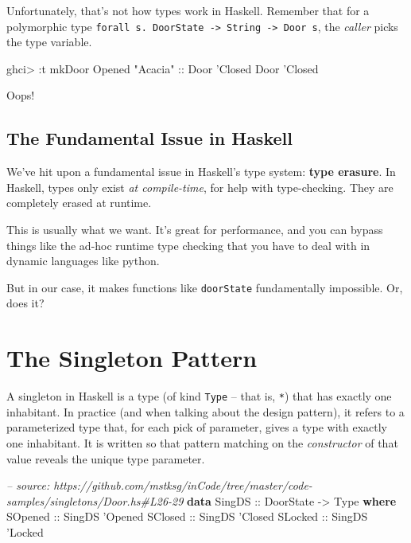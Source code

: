\documentclass[]{article}
\newenvironment{Shaded}{\begin{snugshade}}{\end{snugshade}}
\newcommand{\CharTok}[1]{\textcolor[rgb]{0.31,0.60,0.02}{#1}}
\newcommand{\CommentTok}[1]{\textcolor[rgb]{0.56,0.35,0.01}{\textit{#1}}}
\newcommand{\DataTypeTok}[1]{\textcolor[rgb]{0.13,0.29,0.53}{#1}}
\newcommand{\FunctionTok}[1]{\textcolor[rgb]{0.00,0.00,0.00}{#1}}
\newcommand{\KeywordTok}[1]{\textcolor[rgb]{0.13,0.29,0.53}{\textbf{#1}}}
\newcommand{\NormalTok}[1]{#1}
\newcommand{\OtherTok}[1]{\textcolor[rgb]{0.56,0.35,0.01}{#1}}
\newcommand{\StringTok}[1]{\textcolor[rgb]{0.31,0.60,0.02}{#1}}
\begin{document}
Unfortunately, that's not how types work in Haskell. Remember that for a
polymorphic type
\texttt{forall\ s.\ DoorState\ -\textgreater{}\ String\ -\textgreater{}\ Door\ s},
the \emph{caller} picks the type variable.

\begin{Shaded}
\begin{Highlighting}[]
\NormalTok{ghci}\FunctionTok{>} \FunctionTok{:}\NormalTok{t mkDoor }\DataTypeTok{Opened} \StringTok{"Acacia"}\OtherTok{ ::} \DataTypeTok{Door} \CharTok{'Closed}
\DataTypeTok{Door} \CharTok{'Closed}
\end{Highlighting}
\end{Shaded}

Oops!

\hypertarget{the-fundamental-issue-in-haskell}{%
\subsection{The Fundamental Issue in
Haskell}\label{the-fundamental-issue-in-haskell}}

We've hit upon a fundamental issue in Haskell's type system: \textbf{type
erasure}. In Haskell, types only exist \emph{at compile-time}, for help with
type-checking. They are completely erased at runtime.

This is usually what we want. It's great for performance, and you can bypass
things like the ad-hoc runtime type checking that you have to deal with in
dynamic languages like python.

But in our case, it makes functions like \texttt{doorState} fundamentally
impossible. Or, does it?

\hypertarget{the-singleton-pattern}{%
\section{The Singleton Pattern}\label{the-singleton-pattern}}

A singleton in Haskell is a type (of kind \texttt{Type} -- that is, \texttt{*})
that has exactly one inhabitant. In practice (and when talking about the design
pattern), it refers to a parameterized type that, for each pick of parameter,
gives a type with exactly one inhabitant. It is written so that pattern matching
on the \emph{constructor} of that value reveals the unique type parameter.

\begin{Shaded}
\begin{Highlighting}[]
\CommentTok{-- source: https://github.com/mstksg/inCode/tree/master/code-samples/singletons/Door.hs#L26-29}
\KeywordTok{data} \DataTypeTok{SingDS}\OtherTok{ ::} \DataTypeTok{DoorState} \OtherTok{->} \DataTypeTok{Type} \KeywordTok{where}
    \DataTypeTok{SOpened}\OtherTok{ ::} \DataTypeTok{SingDS} \CharTok{'Opened}
    \DataTypeTok{SClosed}\OtherTok{ ::} \DataTypeTok{SingDS} \CharTok{'Closed}
    \DataTypeTok{SLocked}\OtherTok{ ::} \DataTypeTok{SingDS} \CharTok{'Locked}
\end{Highlighting}
\end{Shaded}
\end{document}
